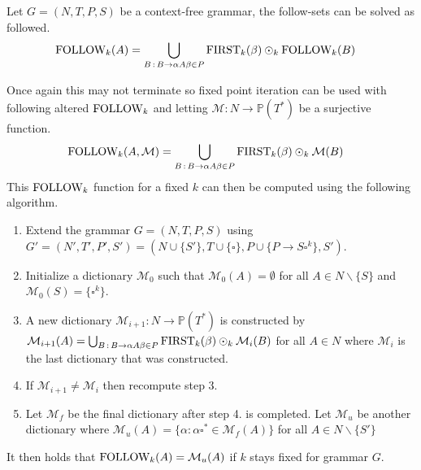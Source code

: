 \begin{algorithm}
    \label{algorithm:follow}
    Let $G = (N, T, P, S)$ be a context-free grammar, the follow-sets can be solved as followed.
    \begin{align*}
        \text{FOLLOW}_k(A) &= \bigcup_{B \, : \, B \to \alpha A \beta \in P} \text{FIRST}_k(\beta) \odot_k \text{FOLLOW}_k(B)
    \end{align*}
\end{algorithm}
\noindent Once again this may not terminate so fixed point iteration can be used with following altered $\text{FOLLOW}_k$ and letting $\mathcal{M}: N \to \mathbb{P}(T^*)$ be a surjective function.
\begin{align*}
    \text{FOLLOW}_k(A, \mathcal{M}) &= \bigcup_{B \,: \, B \to \alpha A \beta \in P} \text{FIRST}_k(\beta) \odot_k \mathcal{M}(B)
\end{align*}
This $\text{FOLLOW}_k$ function for a fixed $k$ can then be computed using the following algorithm.
\begin{enumerate}
    \item Extend the grammar $G = (N, T, P, S)$ using $G' = (N', T', P', S') = (N \cup \{S'\}, T \cup \{\square\}, P \cup \{P \to S \square^k\}, S')$.
    \item Initialize a dictionary $\mathcal{M}_0$ such that $\mathcal{M}_0(A) = \emptyset$ for all $A \in N \backslash \{S\}$ and $\mathcal{M}_0(S) = \{\square^k\}$.
    \item A new dictionary $\mathcal{M}_{i+1}: N \to \mathbb{P}(T^*)$ is constructed by $\mathcal{M}_{i+1}(A) = \bigcup_{B \,: \, B \to  \alpha A \beta \in P} \text{FIRST}_k(\beta) \odot_k \mathcal{M}_{i}(B)$ for all $A \in N$ where $\mathcal{M}_{i}$ is the last dictionary that was constructed.
    \item If $\mathcal{M}_{i+1} \neq \mathcal{M}_{i}$ then recompute step 3.
    \item Let $\mathcal{M}_f$ be the final dictionary after step 4. is completed. Let $\mathcal{M}_u$ be another dictionary where $\mathcal{M}_u(A) = \{\alpha : \alpha \square^* \in \mathcal{M}_f(A)\}$ for all $A \in N \backslash \{S'\}$ 
\end{enumerate}
It then holds that $\text{FOLLOW}_k(A) = \mathcal{M}_u(A)$ if $k$ stays fixed for grammar $G$.